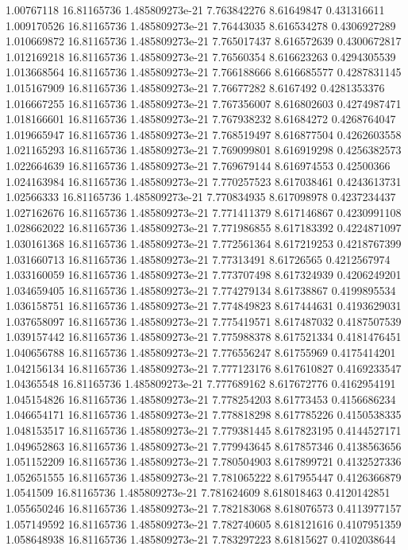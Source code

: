 {1.00767118 16.81165736 1.485809273e-21 7.763842276 8.61649847 0.431316611
1.009170526 16.81165736 1.485809273e-21 7.76443035 8.616534278 0.4306927289
1.010669872 16.81165736 1.485809273e-21 7.765017437 8.616572639 0.4300672817
1.012169218 16.81165736 1.485809273e-21 7.76560354 8.616623263 0.4294305539
1.013668564 16.81165736 1.485809273e-21 7.766188666 8.616685577 0.4287831145
1.015167909 16.81165736 1.485809273e-21 7.76677282 8.6167492 0.4281353376
1.016667255 16.81165736 1.485809273e-21 7.767356007 8.616802603 0.4274987471
1.018166601 16.81165736 1.485809273e-21 7.767938232 8.61684272 0.4268764047
1.019665947 16.81165736 1.485809273e-21 7.768519497 8.616877504 0.4262603558
1.021165293 16.81165736 1.485809273e-21 7.769099801 8.616919298 0.4256382573
1.022664639 16.81165736 1.485809273e-21 7.769679144 8.616974553 0.42500366
1.024163984 16.81165736 1.485809273e-21 7.770257523 8.617038461 0.4243613731
1.02566333 16.81165736 1.485809273e-21 7.770834935 8.617098978 0.4237234437
1.027162676 16.81165736 1.485809273e-21 7.771411379 8.617146867 0.4230991108
1.028662022 16.81165736 1.485809273e-21 7.771986855 8.617183392 0.4224871097
1.030161368 16.81165736 1.485809273e-21 7.772561364 8.617219253 0.4218767399
1.031660713 16.81165736 1.485809273e-21 7.77313491 8.61726565 0.4212567974
1.033160059 16.81165736 1.485809273e-21 7.773707498 8.617324939 0.4206249201
1.034659405 16.81165736 1.485809273e-21 7.774279134 8.61738867 0.4199895534
1.036158751 16.81165736 1.485809273e-21 7.774849823 8.617444631 0.4193629031
1.037658097 16.81165736 1.485809273e-21 7.775419571 8.617487032 0.4187507539
1.039157442 16.81165736 1.485809273e-21 7.775988378 8.617521334 0.4181476451
1.040656788 16.81165736 1.485809273e-21 7.776556247 8.61755969 0.4175414201
1.042156134 16.81165736 1.485809273e-21 7.777123176 8.617610827 0.4169233547
1.04365548 16.81165736 1.485809273e-21 7.777689162 8.617672776 0.4162954191
1.045154826 16.81165736 1.485809273e-21 7.778254203 8.61773453 0.4156686234
1.046654171 16.81165736 1.485809273e-21 7.778818298 8.617785226 0.4150538335
1.048153517 16.81165736 1.485809273e-21 7.779381445 8.617823195 0.4144527171
1.049652863 16.81165736 1.485809273e-21 7.779943645 8.617857346 0.4138563656
1.051152209 16.81165736 1.485809273e-21 7.780504903 8.617899721 0.4132527336
1.052651555 16.81165736 1.485809273e-21 7.781065222 8.617955447 0.4126366879
1.0541509 16.81165736 1.485809273e-21 7.781624609 8.618018463 0.4120142851
1.055650246 16.81165736 1.485809273e-21 7.782183068 8.618076573 0.4113977157
1.057149592 16.81165736 1.485809273e-21 7.782740605 8.618121616 0.4107951359
1.058648938 16.81165736 1.485809273e-21 7.783297223 8.61815627 0.4102038644
}
